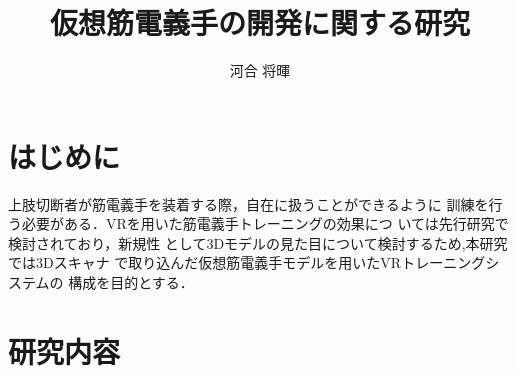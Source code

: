 \documentclass{ltjsarticle}
\title{仮想筋電義手の開発に関する研究}
\author{河合 将暉}
\begin{document}
\maketitle

\section{はじめに}
	上肢切断者が筋電義手を装着する際，自在に扱うことができるように
	訓練を行う必要がある．VRを用いた筋電義手トレーニングの効果につ
	いては先行研究\cite{ref:1}\cite{ref:2}で検討されており，新規性
	として3Dモデルの見た目について検討するため,本研究では3Dスキャナ
	で取り込んだ仮想筋電義手モデルを用いたVRトレーニングシステムの
	構成を目的とする．
\section{研究内容}
\end{document}
